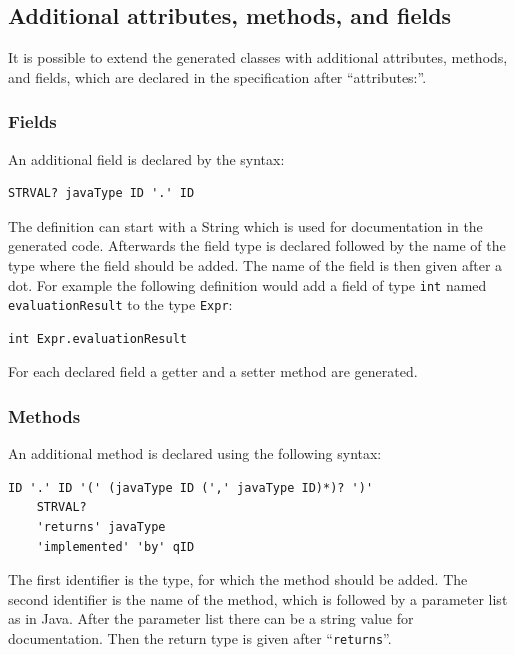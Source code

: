 \documentclass{scrartcl}
\begin{document}
\subsection{Additional attributes, methods, and fields}
\label{Attributes}

It is possible to extend the generated classes with additional attributes, methods, and fields, which are declared in the specification after ``attributes:''.

\subsubsection{Fields}

An additional field is declared by the syntax:

\begin{lstlisting}
STRVAL? javaType ID '.' ID
\end{lstlisting}

The definition can start with a String which is used for documentation in the generated code.
Afterwards the field type is declared followed by the name of the type where the field should be added.
The name of the field is then given after a dot.
For example the following definition would add a field of type \lstinline!int! named \lstinline!evaluationResult! to the type \lstinline!Expr!:

\begin{lstlisting}
int Expr.evaluationResult
\end{lstlisting}

For each declared field a getter and a setter method are generated.

\subsubsection{Methods}

An additional method is declared using the following syntax:

\begin{lstlisting}
ID '.' ID '(' (javaType ID (',' javaType ID)*)? ')'
    STRVAL?
    'returns' javaType
    'implemented' 'by' qID
\end{lstlisting}

The first identifier is the type, for which the method should be added.
The second identifier is the name of the method, which is followed by a parameter list as in Java.
After the parameter list there can be a string value for documentation.
Then the return type is given after ``\lstinline!returns!''.
\end{document}
